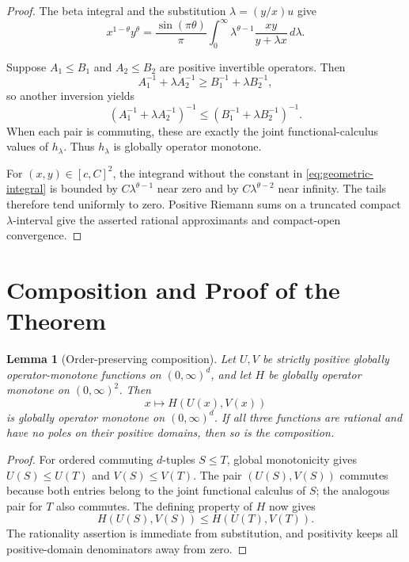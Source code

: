 \documentclass[11pt]{article}
\newtheorem{lemma}{Lemma}
\newcommand{\Pos}{(0,\infty)}
\begin{document}
\begin{proof}
The beta integral and the substitution $\lambda=(y/x)u$ give
\begin{equation}\label{eq:geometric-integral}
 x^{1-\theta}y^\theta
 =\frac{\sin(\pi\theta)}{\pi}
   \int_0^\infty \lambda^{\theta-1}
        \frac{xy}{y+\lambda x}\,d\lambda.
\end{equation}

Suppose $A_1\leq B_1$ and $A_2\leq B_2$ are positive invertible operators.
Then
\[
 A_1^{-1}+\lambda A_2^{-1}
 \geq B_1^{-1}+\lambda B_2^{-1},
\]
so another inversion yields
\[
 (A_1^{-1}+\lambda A_2^{-1})^{-1}
 \leq(B_1^{-1}+\lambda B_2^{-1})^{-1}.
\]
When each pair is commuting, these are exactly the joint functional-calculus
values of $h_\lambda$.  Thus $h_\lambda$ is globally operator monotone.

For $(x,y)\in[c,C]^2$, the integrand without the constant in
\eqref{eq:geometric-integral} is bounded by
$C\lambda^{\theta-1}$ near zero and by
$C\lambda^{\theta-2}$ near infinity.  The tails therefore tend uniformly to
zero.  Positive Riemann sums on a truncated compact $\lambda$-interval give
the asserted rational approximants and compact-open convergence.
\end{proof}

\section*{Composition and Proof of the Theorem}

\begin{lemma}[Order-preserving composition]\label{lem:composition}
Let $U,V$ be strictly positive globally operator-monotone functions on
$\Pos^d$, and let $H$ be globally operator monotone on $\Pos^2$.  Then
\[
                         x\longmapsto H(U(x),V(x))
\]
is globally operator monotone on $\Pos^d$.  If all three functions are
rational and have no poles on their positive domains, then so is the
composition.
\end{lemma}

\begin{proof}
For ordered commuting $d$-tuples $S\leq T$, global monotonicity gives
$U(S)\leq U(T)$ and $V(S)\leq V(T)$.  The pair $(U(S),V(S))$ commutes because
both entries belong to the joint functional calculus of $S$; the analogous
pair for $T$ also commutes.  The defining property of $H$ now gives
\[
 H(U(S),V(S))\leq H(U(T),V(T)).
\]
The rationality assertion is immediate from substitution, and positivity
keeps all positive-domain denominators away from zero.
\end{proof}
\end{document}
